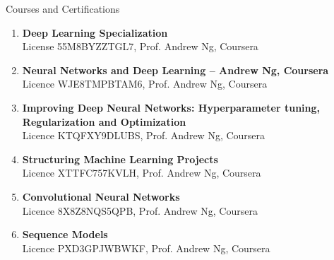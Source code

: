 \documentclass{resume}
\begin{document}
\begin{rSection}{Courses and Certifications}
    \begin{enumerate}[leftmargin=0.45cm, itemsep=0em, topsep=0.5em, parsep=0.2em]
        \item \textbf{Deep Learning Specialization}\\
        License 55M8BYZZTGL7, Prof. Andrew Ng, Coursera
        \item \textbf{Neural Networks and Deep Learning – Andrew Ng, Coursera}\\
        Licence WJE8TMPBTAM6, Prof. Andrew Ng, Coursera
        \item \textbf{Improving Deep Neural Networks: Hyperparameter tuning, Regularization and Optimization} \\
        Licence KTQFXY9DLUBS, Prof. Andrew Ng, Coursera
        \item \textbf{Structuring Machine Learning Projects} \\
        Licence XTTFC757KVLH, Prof. Andrew Ng, Coursera
        \item \textbf{Convolutional Neural Networks}\\
        Licence 8X8Z8NQS5QPB, Prof. Andrew Ng, Coursera
        \item \textbf{Sequence Models}\\
        Licence PXD3GPJWBWKF, Prof. Andrew Ng, Coursera
    
    \end{enumerate}
\end{rSection}
\end{document}
